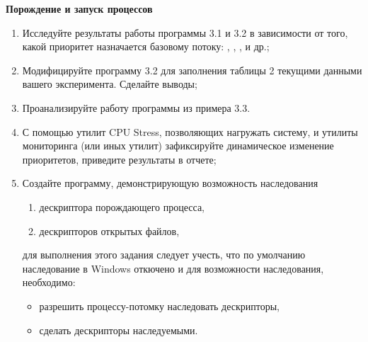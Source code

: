\renewcommand{\labelenumii}{\theenumii}
\renewcommand{\theenumii}{\theenumi.\arabic{enumii}.}

\textbf{Порождение и запуск процессов}

\begin{enumerate}
	\item Исследуйте результаты работы программы 3.1 и 3.2 в зависимости от того, какой приоритет назначается базовому потоку: , , ,  и др.;
	\item Модифицируйте программу 3.2 для заполнения таблицы 2 текущими данными вашего эксперимента. Сделайте выводы;
	\item Проанализируйте работу программы из примера 3.3.
	\item С помощью утилит CPU Stress, позволяющих нагружать систему, и утилиты мониторинга  (или иных утилит) зафиксируйте динамическое изменение приоритетов, приведите результаты в отчете;
	\item Создайте программу, демонстрирующую возможность наследования
		\begin{enumerate}
			\item дескриптора порождающего процесса,
			\item дескрипторов открытых файлов,
		\end{enumerate}
	для выполнения этого задания следует учесть, что по умолчанию наследование в Windows откючено и для возможности наследования, необходимо:
		\begin{itemize}
			\item разрешить процессу-потомку наследовать дескрипторы,
			\item сделать дескрипторы наследуемыми.
		\end{itemize}
\end{enumerate}